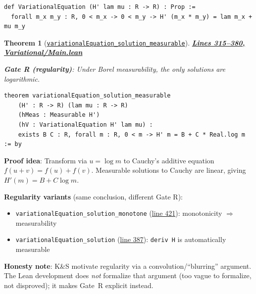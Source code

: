 \documentclass[11pt]{article}
\newtheorem{theorem}{Theorem}[section]
\theoremstyle{definition}
\theoremstyle{remark}
\begin{document}
\begin{lstlisting}[caption={Separated variational equation},firstnumber=206]
def VariationalEquation (H' lam mu : R -> R) : Prop :=
  forall m_x m_y : R, 0 < m_x -> 0 < m_y -> H' (m_x * m_y) = lam m_x + mu m_y
\end{lstlisting}

\begin{theorem}[\href{https://github.com/zariuq/ks-foundations-of-inference/blob/main/KnuthSkilling/Variational/Main.lean\#L315}{\texttt{variationalEquation\_solution\_measurable}}]
\textbf{\href{https://github.com/zariuq/ks-foundations-of-inference/blob/main/KnuthSkilling/Variational/Main.lean\#L315-L380}{Lines 315--380, Variational/Main.lean}}

\textbf{Gate R (regularity)}: Under Borel measurability, the only solutions are logarithmic.
\end{theorem}

\begin{lstlisting}[caption={Path A rigidity theorem: measurability forces log},firstnumber=315]
theorem variationalEquation_solution_measurable
    (H' : R -> R) (lam mu : R -> R)
    (hMeas : Measurable H')
    (hV : VariationalEquation H' lam mu) :
    exists B C : R, forall m : R, 0 < m -> H' m = B + C * Real.log m := by
\end{lstlisting}

\textbf{Proof idea}: Transform via $u = \log m$ to Cauchy's additive equation $f(u+v) = f(u) + f(v)$. Measurable solutions to Cauchy are linear, giving $H'(m) = B + C \log m$.

\textbf{Regularity variants} (same conclusion, different Gate R):
\begin{itemize}
\item \texttt{variationalEquation\_solution\_monotone} (\href{https://github.com/zariuq/ks-foundations-of-inference/blob/main/KnuthSkilling/Variational/Main.lean\#L421}{line 421}): monotonicity $\Rightarrow$ measurability
\item \texttt{variationalEquation\_solution} (\href{https://github.com/zariuq/ks-foundations-of-inference/blob/main/KnuthSkilling/Variational/Main.lean\#L387}{line 387}): \texttt{deriv H} is automatically measurable
\end{itemize}

\textbf{Honesty note}: K\&S motivate regularity via a convolution/``blurring'' argument. The Lean development does \emph{not} formalize that argument (too vague to formalize, not disproved); it makes Gate~R explicit instead.
\end{document}
